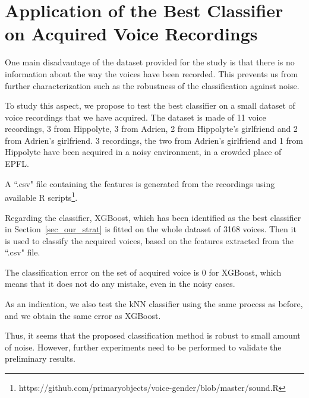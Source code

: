 \chapter{Application of the Best Classifier on Acquired Voice Recordings}
\label{chap_test_our_dataset}

One main disadvantage of the dataset provided for the study is that there is no information about the way the voices have been recorded. This prevents us from further characterization such as the robustness of the classification against noise.

To study this aspect, we propose to test the best classifier on a small dataset of voice recordings that we have acquired. The dataset is made of \num{11} voice recordings, \num{3} from Hippolyte, \num{3} from Adrien, \num{2} from Hippolyte's girlfriend and \num{2} from Adrien's girlfriend. \num{3} recordings, \eg{} the two from Adrien's girlfriend and \num{1} from Hippolyte have been acquired in a noisy environment, \ie{} in a crowded place of EPFL.

A ``.csv" file containing the features is generated from the recordings using available R scripts\footnote{https://github.com/primaryobjects/voice-gender/blob/master/sound.R}. 

Regarding the classifier, XGBoost, which has been identified as the best classifier in Section~\ref{sec_our_strat} is fitted on the whole dataset of \num{3168} voices. Then it is used to classify the acquired voices, based on the features extracted from the ``.csv" file.

The classification error on the set of acquired voice is \num{0} for XGBoost, which means that it does not do any mistake, even in the noisy cases.

As an indication, we also test the kNN classifier using the same process as before, and we obtain the same error as XGBoost.

Thus, it seems that the proposed classification method is robust to small amount of noise. However, further experiments need to be performed to validate the preliminary results. 



